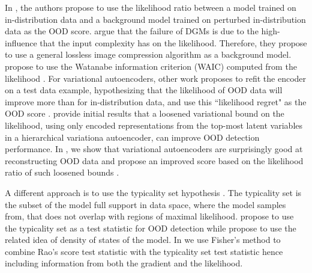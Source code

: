In \textcite{ren_likelihood_2019}, the authors propose to use the likelihood ratio between a model trained on in-distribution data and a background model trained on perturbed in-distribution data as the OOD score. 
\textcite{serra_input_2020} argue that the failure of DGMs is due to the high-influence that the input complexity has on the likelihood. Therefore, they propose to use a general lossless image compression algorithm as a background model. 
\textcite{choi_waic_2019} propose to use the Watanabe information criterion (WAIC) computed from the likelihood \cite{watanabe_algebraic_2009, watanabe_asymptotic_2010}. 
For variational autoencoders, other work proposes to refit the encoder on a test data example, hypothesizing that the likelihood of OOD data will improve more than for in-distribution data, and use this ``likelihood regret" as the OOD score \cite{xiao_likelihood_2020}. 
\textcite{maaloe_biva_2019} provide initial results that a loosened variational bound on the likelihood, using only encoded representations from the top-most latent variables in a hierarchical variationa autoencoder, can improve OOD detection performance. In \textcite{havtorn_hierarchical_2021}, we show that variational autoencoders are surprisingly good at reconstructing OOD data and propose an improved score based on the likelihood ratio of such loosened bounds \textcite{maaloe_biva_2019}.

A different approach is to use the typicality set hypothesis \cite{nalisnick_detecting_2019}. The typicality set is the subset of the model full support in data space, where the model samples from, that does not overlap with regions of maximal likelihood. \textcite{nalisnick_detecting_2019} propose to use the typicality set as a test statistic for OOD detection while \textcite{morningstar_density_2021} propose to use the related idea of density of states of the model. 
In \textcite{bergamin_modelagnostic_2022} we use Fisher's method \cite{fisher_statistical_1925} to combine Rao's score test statistic \cite{rao_large_1948} with the typicality set test statistic hence including information from both the gradient and the likelihood.


